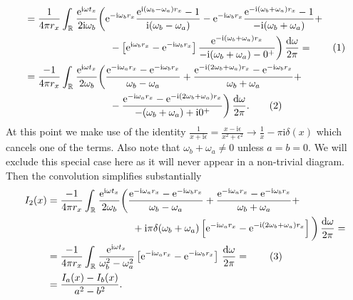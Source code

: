 \documentclass[english, parskip=full]{scrartcl}
\newcommand\numberthis{\addtocounter{equation}{1}\tag{\theequation}}
\newcommand{\intr}{}
\newcommand{\klam}{}
\renewcommand{\i}{\text{i}}
\newcommand{\e}{\text{e}}
\begin{document}
\begin{align*}
 &= \frac{1}{4\pi r_x} \intr\int_{\mathbb{R}^{ }} \frac{\e^{\i\omega t_x}}{2\i \omega_b} \bigg( \e^{-\i \omega_b r_x} \frac{\e^{\i (\omega_b - \omega_a) r_x} - 1}{\i (\omega_b - \omega_a)} - \e^{-\i\omega_b r_x} \frac{\e^{-\i(\omega_b + \omega_a) r_x} - 1}{-\i (\omega_b + \omega_a)} + \\
 &\hspace{3cm} - \left[ \e^{\i\omega_b r_x} - \e^{-\i\omega_b r_x} \right] \frac{\e^{-\i (\omega_b + \omega_a) r_x}}{-\i (\omega_b + \omega_a) - 0^+} \bigg) \, \frac{\mathrm{d}\omega}{2\pi} =  \numberthis \\
 &= \frac{-1}{4\pi r_x} \intr\int_{\mathbb{R}^{ }} \frac{\e^{\i\omega t_x}}{2 \omega_b} \bigg( \frac{\e^{-\i \omega_a r_x} - \e^{-\i \omega_b r_x}}{\omega_b - \omega_a} + \frac{\e^{-\i(2\omega_b + \omega_a) r_x} - \e^{-\i\omega_b r_x} }{\omega_b + \omega_a} + \\
 &\hspace{3cm} -  \frac{\e^{-\i \omega_a r_x} - \e^{-\i (2\omega_b + \omega_a) r_x}}{-(\omega_b + \omega_a) + \i 0^+} \bigg) \, \frac{\mathrm{d}\omega}{2\pi}. \numberthis 
\end{align*}
At this point we make use of the identity $\frac{1}{x + \i \epsilon} = \frac{x - \i \epsilon}{x^2 + \epsilon^2} \rightarrow \frac{1}{x} - \pi\i \delta(x) $ which cancels one of the terms.
Also note that $\omega_b + \omega_a \neq 0$ unless $a=b=0$.
We will exclude this special case here as it will never appear in a non-trivial diagram.
Then the convolution simplifies substantially
\begin{align*}
I_2(x) &= \frac{-1}{4\pi r_x} \intr\int_{\mathbb{R}^{ }} \frac{\e^{\i\omega t_x}}{2\omega_b} \bigg( \frac{\e^{-\i\omega_a r_x} - \e^{-\i\omega_b r_x}}{\omega_b - \omega_a} + \frac{\e^{-\i\omega_a r_x} - \e^{-\i\omega_b r_x}}{\omega_b + \omega_a} + \\
&\hspace{3cm} + \i\pi \delta (\omega_b + \omega_a) \klam\left[ \e^{-\i \omega_a r_x} - \e^{-\i (2\omega_b + \omega_a) r_x} \right] \bigg) \, \frac{\mathrm{d}\omega}{2\pi} = \\
&= \frac{-1}{4\pi r_x} \intr\int_{\mathbb{R}^{ }} \frac{\e^{\i\omega t_x}}{\omega_b^2 - \omega_a^2} \klam\left[ \e^{-\i\omega_a r_x} - \e^{-\i\omega_b r_x} \right] \, \frac{\mathrm{d}\omega}{2\pi} = \numberthis \\
&= \frac{I_a(x) - I_b(x)}{a^2 - b^2}.
\end{align*}
\end{document}
